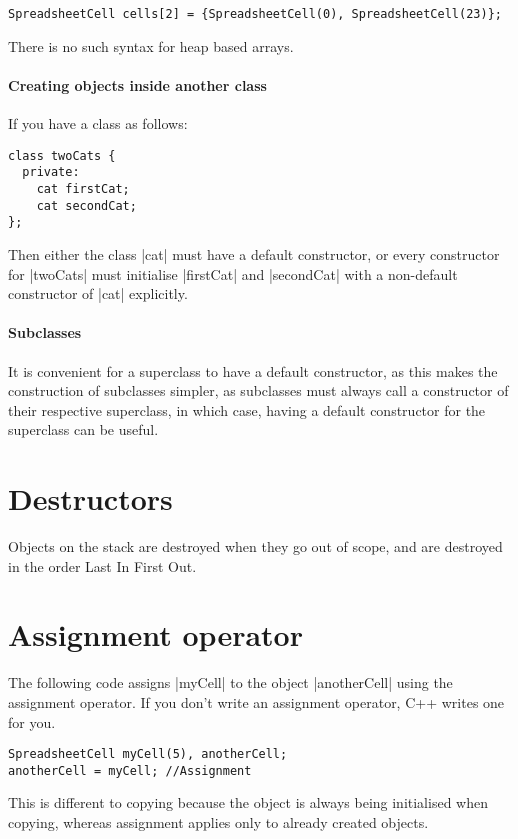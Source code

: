 \documentclass[a4paper,12pt,oneside]{book}
\begin{document}
{\begin{lstlisting}[caption={Example of \emph{initialisers}}]
SpreadsheetCell cells[2] = {SpreadsheetCell(0), SpreadsheetCell(23)};
\end{lstlisting}

There is no such syntax for heap based arrays.

\paragraph{Creating objects inside another class}
If you have a class as follows:

\begin{lstlisting}
class twoCats {
  private:
    cat firstCat;
    cat secondCat;
};
\end{lstlisting}
Then either the class \lst|cat| must have a default constructor, or every constructor for \lst|twoCats| must initialise \lst|firstCat| and \lst|secondCat| with a non-default constructor of \lst|cat| explicitly.

\paragraph{Subclasses}
It is convenient for a superclass to have a default constructor, as this makes the construction of subclasses simpler, as subclasses must always call a constructor of their respective superclass, in which case, having a default constructor for the superclass can be useful.


\section{Destructors}
Objects on the stack are destroyed when they go out of scope, and are destroyed in the order Last In First Out.

\section{Assignment operator}
The following code assigns \lst|myCell| to the object \lst|anotherCell| using the assignment operator. If you don't write an assignment operator, C++ writes one for you.

\begin{lstlisting}
SpreadsheetCell myCell(5), anotherCell;
anotherCell = myCell; //Assignment
\end{lstlisting}

This is different to copying because the object is always being initialised when copying, whereas assignment applies only to already created objects.

}
\end{document}
